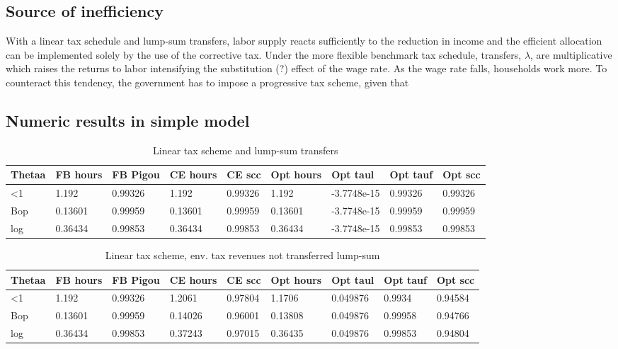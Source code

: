 \subsection{Source of inefficiency}
With a linear tax schedule and lump-sum transfers, labor supply reacts sufficiently to the reduction in income and the efficient allocation can be implemented solely by the use of the corrective tax. Under the more flexible benchmark tax schedule, transfers, $\lambda$, are multiplicative which raises the returns to labor intensifying the substitution (?) effect of the wage rate. As the wage rate falls, households work more. To counteract this tendency, the government has to impose a progressive tax scheme, given that 


\subsection{Numeric results in simple model}
\begin{table}[h!!]
	\caption{Linear tax scheme and lump-sum transfers}\label{tab:lin_lst}
	\begin{tabular}{lllllllll}
		Thetaa & FB hours & FB Pigou & CE hours & CE scc & Opt hours & Opt taul & Opt tauf & Opt scc \\ 
		\hline 
		<1 & 1.192 & 0.99326 & 1.192 & 0.99326 & 1.192 & -3.7748e-15 & 0.99326 & 0.99326 \\ 
		Bop & 0.13601 & 0.99959 & 0.13601 & 0.99959 & 0.13601 & -3.7748e-15 & 0.99959 & 0.99959 \\ 
		log & 0.36434 & 0.99853 & 0.36434 & 0.99853 & 0.36434 & -3.7748e-15 & 0.99853 & 0.99853 \\ 
		\hline 
	\end{tabular}
\end{table}
\begin{table}
	\caption{Linear tax scheme, env. tax revenues not transferred lump-sum}\label{tab:lin_nolst}
	\begin{tabular}{lllllllll}
		Thetaa & FB hours & FB Pigou & CE hours & CE scc & Opt hours & Opt taul & Opt tauf & Opt scc \\ 
		\hline 
		<1 & 1.192 & 0.99326 & 1.2061 & 0.97804 & 1.1706 & 0.049876 & 0.9934 & 0.94584 \\ 
		Bop & 0.13601 & 0.99959 & 0.14026 & 0.96001 & 0.13808 & 0.049876 & 0.99958 & 0.94766 \\ 
		log & 0.36434 & 0.99853 & 0.37243 & 0.97015 & 0.36435 & 0.049876 & 0.99853 & 0.94804 \\ 
		\hline 
	\end{tabular}
\end{table}
